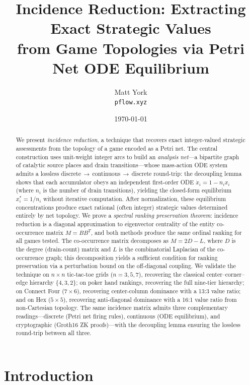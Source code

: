 \documentclass[11pt,a4paper]{article}
\title{Incidence Reduction: Extracting Exact Strategic Values\\
from Game Topologies via Petri Net ODE Equilibrium}
\author{
  Matt York\\
  \texttt{pflow.xyz}
}
\date{\today}
\begin{document}
\maketitle

\begin{abstract}
We present \emph{incidence reduction}, a technique that recovers exact integer-valued strategic assessments from the topology of a game encoded as a Petri net.
The central construction uses unit-weight integer arcs to build an \emph{analysis net}---a bipartite graph of catalytic source places and drain transitions---whose mass-action ODE system admits a lossless discrete$\,\to\,$continuous$\,\to\,$discrete round-trip: the decoupling lemma shows that each accumulator obeys an independent first-order ODE $\dot{x}_i = 1 - n_i x_i$ (where $n_i$ is the number of drain transitions), yielding the closed-form equilibrium $x_i^* = 1/n_i$ without iterative computation.
After normalization, these equilibrium concentrations produce exact rational (often integer) strategic values determined entirely by net topology.
We prove a \emph{spectral ranking preservation theorem}: incidence reduction is a diagonal approximation to eigenvector centrality of the entity co-occurrence matrix $M = BB^T$, and both methods produce the same ordinal ranking for all games tested.
The co-occurrence matrix decomposes as $M = 2D - L$, where $D$ is the degree (drain-count) matrix and $L$ is the combinatorial Laplacian of the co-occurrence graph; this decomposition yields a sufficient condition for ranking preservation via a perturbation bound on the off-diagonal coupling.
We validate the technique on $n \times n$ tic-tac-toe grids ($n = 3, 5, 7$), recovering the classical center--corner--edge hierarchy $\{4, 3, 2\}$; on poker hand rankings, recovering the full nine-tier hierarchy; on Connect Four ($7 \times 6$), recovering center-column dominance with a 13:3 value ratio; and on Hex ($5 \times 5$), recovering anti-diagonal dominance with a 16:1 value ratio from non-Cartesian topology.
The same incidence matrix admits three complementary readings---discrete (Petri net firing rules), continuous (ODE equilibrium), and cryptographic (Groth16 ZK proofs)---with the decoupling lemma ensuring the lossless round-trip between all three.
\end{abstract}

\section{Introduction}
\label{sec:intro}
\end{document}

